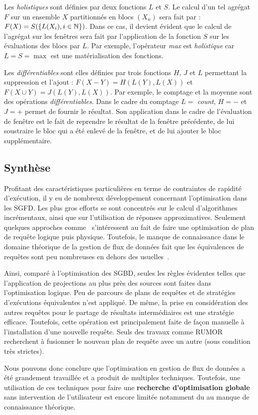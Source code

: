 Les \textit{holistiques} sont définies par deux fonctions $L$ et $S$. Le calcul d'un tel agrégat $F$ sur un ensemble $X$ partitionnés en blocs $(X_n)$ sera fait par : $F(X) = S(\{L(X_i), i\in \mathbb{N}\})$. Dans ce cas, il devient évident que le calcul de l'agrégat sur les fenêtres sera fait par l'application de la fonction $S$ sur les évaluations des blocs par $L$. Par exemple, l'opérateur \textit{max} est \textit{holistique} car $L=S=\max$ est une matérialisation des fonctions. 

Les \textit{différentiables} sont elles définies par trois fonctions $H$, $J$ et $L$ permettant la suppression et l'ajout : $F(X-Y) = H(L(Y), L(X))$ et $F(X\cup Y) = J(L(Y), L(X))$. Par exemple, le comptage et la moyenne sont des opérations \textit{différentiables}. Dans le cadre du comptage $L=$ \textit{count}, $H=-$ et $J=+$ permet de fournir le résultat. Son application dans le cadre de l'évaluation de fenêtre est le fait de reprendre le résultat de la fenêtre précédente, de lui soustraire le bloc qui a été enlevé de la fenêtre, et de lui ajouter le bloc supplémentaire.

\subsection{Synthèse}
Profitant des caractéristiques particulières en terme de contraintes de rapidité d'exécution, il y eu de nombreux développement concernant l'optimisation dans les SGFD. Les plus gros efforts se sont concentrés sur le calcul d'algorithmes incrémentaux, ainsi que sur l'utilisation de réponses approximatives. Seulement quelques approches comme~\cite{Galpin:snee,Kramer:semantics} s'intéressent au fait de faire une optimisation de plan de requête logique puis physique. Toutefois, le manque de connaissance dans le domaine théorique de la gestion de flux de données fait que les équivalences de requêtes sont peu nombreuses en dehors des usuelles~\cite{Slivinskas:temporal,Arasu:stream}.

Ainsi, comparé à l'optimisation des SGBD, seules les règles évidentes telles que l'application de projections au plus près des sources sont faites dans l'optimisation logique. Peu de parcours de plans de requêtes et de stratégies d'exécutions équivalentes n'est appliqué. De même, la prise en considération des autres requêtes pour le partage de résultats intermédiaires est une stratégie efficace. Toutefois, cette opération est principalement faite de façon manuelle à l'installation d'une nouvelle requête. Seuls des travaux comme RUMOR~\cite{Hong:mqo} recherchent à fusionner le nouveau plan de requête avec un autre (sous condition très strictes).

Nous pouvons donc conclure que l'optimisation en gestion de flux de données a été grandement travaillée et a produit de multiples techniques. Toutefois, une utilisation de ces techniques pour faire une \textbf{recherche d'optimisation globale} sans intervention de l'utilisateur est encore limitée notamment du au manque de connaissance théorique.
